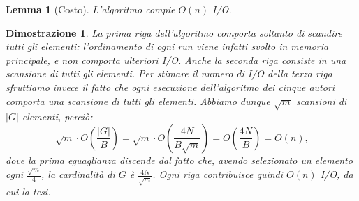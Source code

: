 \documentclass[a4paper, 11pt]{article}
\theoremstyle{plain}
\newtheorem{lemma}{Lemma}
\newtheorem*{proof*}{Dimostrazione}
\begin{document}
    \begin{lemma}[Costo]
        L'algoritmo compie \(O(n)\) I/O.
    \end{lemma}
    \begin{proof*}
        La prima riga dell'algoritmo comporta soltanto di scandire tutti gli
        elementi: l'ordinamento di ogni run viene infatti svolto in memoria
        principale, e non comporta ulteriori I/O. Anche la seconda riga
        consiste in una scansione di tutti gli elementi. Per stimare il numero
        di I/O della terza riga sfruttiamo invece il fatto che ogni esecuzione
        dell'algoritmo dei cinque autori comporta una scansione di tutti gli
        elementi. Abbiamo dunque \(\sqrt{m}\) scansioni di \(|G|\) elementi,
        perci\`o:
        \[
            \sqrt{m}\cdot O\left(\frac{|G|}{B}\right) = \sqrt{m}\cdot O\left(\frac{4N}{B\sqrt{m}}\right) = O\left(\frac{4N}{B}\right) = O(n)\mbox{,}
        \]
        dove la prima eguaglianza discende dal fatto che, avendo selezionato
        un elemento ogni \(\frac{\sqrt{m}}{4}\), la cardinalit\`a di \(G\) \`e
        \(\frac{4N}{\sqrt{m}}\). Ogni riga contribuisce quindi \(O(n)\) I/O, da cui la tesi.
    \end{proof*}
\end{document}

